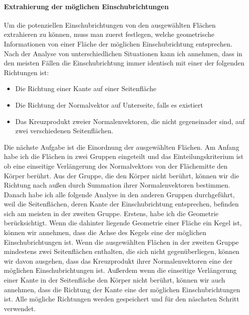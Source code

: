 \documentclass[14pt,a4paper,titlepage]{article}
\begin{document}
		\paragraph{Extrahierung der möglichen Einschubrichtungen} 
			Um die potenziellen Einschubrichtungen von den ausgewählten Flächen extrahieren zu können, muss man zuerst festlegen, welche geometrische Informationen von einer Fläche der möglichen Einschubrichtung entsprechen. Nach der Analyse von unterschiedlichen Situationen kann ich annehmen, dass in den meisten Fällen die Einschubrichtung immer identisch mit einer der folgenden Richtungen ist:
			\begin{itemize}
				\item Die Richtung einer Kante auf einer Seitenfläche
				\item Die Richtung der Normalvektor auf Unterseite, falls es existiert
				\item Das Kreuzprodukt zweier Normalenvektoren, die nicht gegeneinader sind, auf zwei verschiedenen Seitenflächen. 
			\end{itemize} 
			Die nächste Aufgabe ist die Einordnung der ausgewählten Flächen. Am Anfang habe ich die Flächen in zwei Gruppen eingeteilt und das Einteilungskriterium ist ob eine einseitige Verlängerung des Normalvektors von der Flächemitte den Körper berührt. Aus der Gruppe, die den Körper nicht berührt, können wir die Richtung nach außen durch Summation ihrer Normalenvektoren bestimmen. Danach habe ich alle folgende Analyse in den anderen Gruppen durchgeführt, weil die Seitenflächen, deren Kante der Einschubrichtung entsprechen, befinden sich am meisten in der zweiten Gruppe. 
			\bigbreak
			  Erstens, habe ich die Geometrie berücksichtigt. Wenn die dahinter liegende Geometrie einer Fläche ein Kegel ist, können wir annehmen, dass die Achse des Kegels eine der möglichen Einschubrichtungen ist.
			  Wenn die ausgewählten Flächen in der zweiten Gruppe mindestens zwei Seitenflächen enthalten, die sich nicht gegenüberliegen, können wir davon ausgehen, dass das Kreuzprodukt ihrer Normalenvektoren eine der möglichen Einschubrichtungen ist. Außerdem wenn die einseitige Verlängerung einer Kante in der Seitenfläche den Körper nicht berührt, können wir auch annehmen, dass die Richtung der Kante eine der möglichen Einschubrichtungen ist. Alle mögliche Richtungen werden gespeichert und für den näschsten Schritt verwendet.
			  
\end{document}
